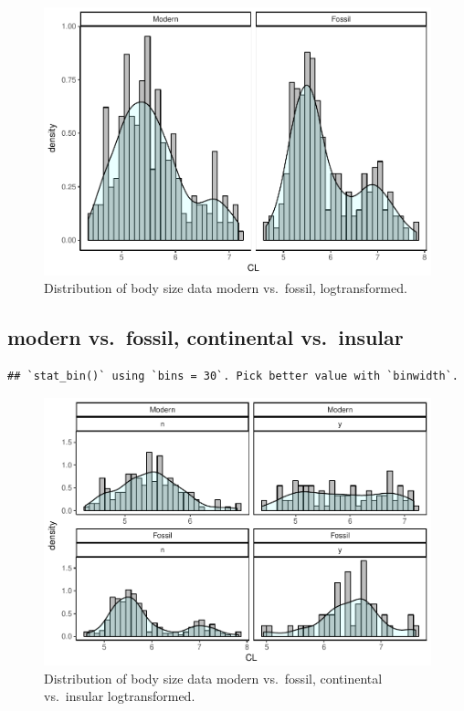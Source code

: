 \documentclass[]{article}
\begin{document}
\begin{figure}[htbp]
\centering
\includegraphics{MA_JJ_files/figure-latex/Histograms of body size data, modern vs. fossil-1.pdf}
\caption{Distribution of body size data modern vs.~fossil,
logtransformed.}
\end{figure}

\newpage

\subsection{modern vs.~fossil, continental
vs.~insular}\label{modern-vs.fossil-continental-vs.insular}

\begin{verbatim}
## `stat_bin()` using `bins = 30`. Pick better value with `binwidth`.
\end{verbatim}

\begin{figure}[htbp]
\centering
\includegraphics{MA_JJ_files/figure-latex/Histograms of body size data, modern vs. fossil, continental vs. insular-1.pdf}
\caption{Distribution of body size data modern vs.~fossil, continental
vs.~insular logtransformed.}
\end{figure}
\end{document}
